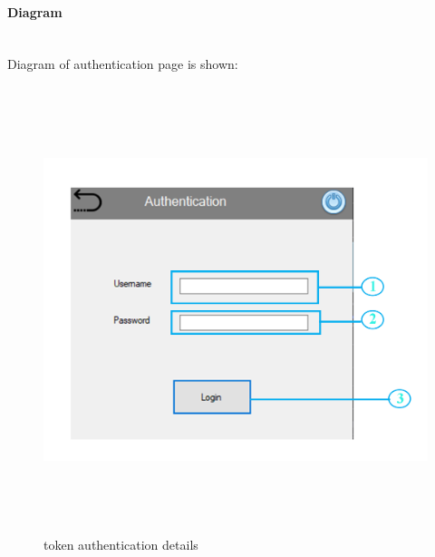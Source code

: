 \documentclass[12pt]{article}
\begin{document}
\paragraph{Diagram}\mbox{}\\
Diagram of authentication page is shown:
\begin{figure}[h]
\includegraphics[width=15cm, height=13cm]{labeled_authentication}
\caption{token authentication details}
\end{figure}
\newpage
\end{document}
